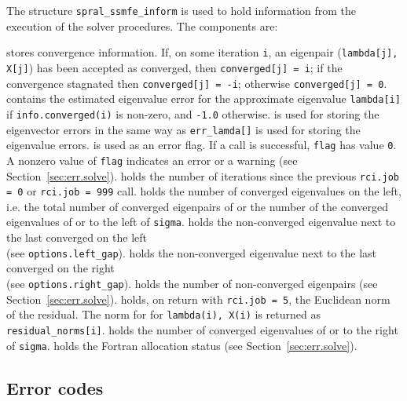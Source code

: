 \label{sec:inform}

The structure {\tt spral\_ssmfe\_inform} is used
to hold information from the execution of
the solver procedures.
The components are:

\begin{description}
%
 stores convergence information.
If, on some iteration {\tt i}, an eigenpair ({\tt lambda[j], X[j]})
has been accepted as converged,
then {\tt converged[j] = i}; if the convergence stagnated
then {\tt converged[j] = -i}; otherwise {\tt converged[j] = 0}.
%
 contains 
the estimated eigenvalue error
for the approximate eigenvalue {\tt lambda[i]}
if {\tt info.converged(i)} is non-zero,
and {\tt -1.0} otherwise.
%
 is used for storing the eigenvector errors
in the same way as {\tt err\_lamda[]} is used
for storing the eigenvalue errors.
%
 is used as an error flag.
If a call is successful, {\tt flag} has value {\tt 0}.
A nonzero value of {\tt flag} indicates an error or a warning
(see Section~\ref{sec:err.solve}).
%
 holds the number of iterations 
since the previous {\tt rci.job = 0} or {\tt rci.job = 999} call.
%
 holds the number of converged eigenvalues on the left,
i.e. the total number of converged eigenpairs of 
or the number of the converged eigenvalues 
of  or 
to the left of {\tt sigma}. 
%
 holds
the non-converged eigenvalue next to the last converged on the left\\
(see {\tt options.left\_gap}).
%
 holds
the non-converged eigenvalue next to the last converged on the right\\
(see {\tt options.right\_gap}).
%
 holds the number of non-converged eigenpairs
(see Section~\ref{sec:err.solve}).
%
 holds, on return with 
{\tt rci.job = 5}, the Euclidean norm of the residual. The norm for
for {\tt lambda(i), X(i)} is returned as {\tt residual\_norms[i]}.
%
holds the number of converged eigenvalues 
of  or 
to the right of {\tt sigma}.
%
holds the Fortran allocation status
(see Section~\ref{sec:err.solve}).
%
\end{description}

\subsection{Error codes}

